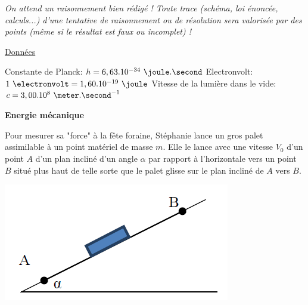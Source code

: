 \vspace{0.3cm}

\textit{On attend un raisonnement bien rédigé ! Toute trace (schéma, loi énoncée, calculs...) d'une tentative de raisonnement ou de résolution sera valorisée par des
points (même si le résultat est faux ou incomplet) !}

\vspace{0.3cm}

\underline{Données}

\vspace{0.3cm}

\noindent Constante de Planck: $h = 6,63 . 10^{-34}\text{ }\joule.\second$\newline
Electronvolt: $1\text{ }\electronvolt = 1,60 . 10^{-19}\text{ }\joule$\newline
Vitesse de la lumière dans le vide: $c = 3,00 . 10^{8}\text{ }\meter.\second^{-1}$


\newpage

\exo \textbf{Energie mécanique}

\vspace{0.3cm}

\begin{minipage}[c]{.46\linewidth}
Pour mesurer sa "force" à la fête foraine, Stéphanie lance un gros palet assimilable à un point matériel de masse $m$. Elle le lance avec une vitesse $V_{0}$ d'un point $A$ d'un plan incliné d'un angle $\alpha$ par
rapport à l'horizontale vers un point $B$ situé plus haut de telle sorte que le palet glisse sur le plan incliné de $A$ vers $B$.
\end{minipage}
\begin{minipage}[c]{.46\linewidth}
\begin{center}
\includegraphics[width=0.75\columnwidth]{images/Exo8_Energie_Mecanique}
\end{center}
\end{minipage}

